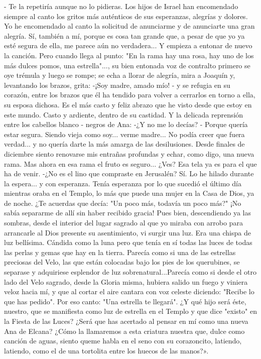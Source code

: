 \documentclass[12pt]{book} %
\begin{document}
- Te la repetiría aunque no lo pidieras. Los hijos de Israel han encomendado siempre al canto los gritos más auténticos de sus esperanzas, alegrías y dolores. Yo he encomendado al canto la solicitud de anunciarme  y de anunciarte una gran alegría. Sí, también a mí, porque es cosa tan grande que, a pesar de que yo ya esté segura de ella, me parece aún no verdadera... 
Y empieza a entonar de nuevo la canción. Pero cuando llega al punto: "En la rama hay una rosa, hay uno de los más dulces pomos, una estrella"..., su bien entonada voz de contralto primero se oye trémula y luego se rompe; se echa a llorar de alegría, mira a Joaquín y, levantando los brazos, grita: 
-¡Soy madre, amado mío! - y se refugia en su corazón, entre los brazos que él ha tendido para volver a cerrarlos en torno a ella, su esposa dichosa. Es el más casto y feliz abrazo que he visto desde que estoy en este mundo. Casto y ardiente, dentro de su castidad. 
Y la delicada reprensión entre los cabellos blanco - negros de Ana: 
-¿Y no me lo decías? 
- Porque quería estar segura. Siendo vieja como soy... verme madre... No podía creer que fuera verdad... y no quería darte la más amarga de las desilusiones. Desde finales de diciembre siento renovarse mis entrañas profundas y echar, como digo, una nueva rama. Mas ahora en esa rama el fruto es seguro... ¿Ves? Esa tela ya es para  el que ha de venir.                       
-¿No es el lino que compraste en Jerusalén?         
Sí. Lo he hilado durante la espera... y con esperanza. Tenía esperanza por lo que sucedió el último día mientras oraba en el Templo, lo más que puede una mujer en la Casa de Dios, ya de noche. ¿Te acuerdas que decía: "Un poco más, todavía un 
poco más?" ¡No sabía separarme de allí sin haber recibido gracia! Pues bien, descendiendo ya las sombras, desde el interior del 
lugar sagrado al que yo miraba con arrobo para arrancarle al Dios presente su asentimiento, vi surgir una luz. Era una chispa de 
luz bellísima. Cándida como la luna pero que tenía en sí todas las luces de todas las perlas y gemas que hay en la tierra. Parecía 
como si una de las estrellas preciosas del Velo, las que están colocadas bajo los pies de los querubines, se separase y adquiriese esplendor de luz sobrenatural...Parecía como si desde el otro lado del Velo sagrado, desde la Gloria misma, hubiera salido un fuego y viniera veloz hacia mí, y que al cortar el aire cantara con voz celeste diciendo: "Recibe lo que has pedido". Por eso canto: "Una estrella te llegará". ¿Y qué hijo será éste, nuestro, que se manifiesta como luz de estrella en el Templo y que dice "existo" en la Fiesta de las Luces? ¿Será que has acertado al pensar en mí como una nueva Ana de Elcana? ¿Cómo la llamaremos a esta criatura nuestra que, dulce como canción de aguas, siento queme habla en el seno con su corazoncito, latiendo, latiendo, como el de una tortolita entre los huecos de las manos?». 
\end{document}
